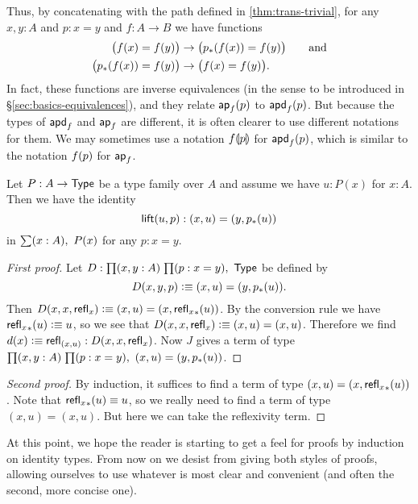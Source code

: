 Thus, by concatenating with the path defined in \autoref{thm:trans-trivial}, for any $x,y:A$ and $p:x=y$ and $f:A\to B$ we have functions
\begin{align}
  \big(f(x) = f(y)\big) &\to \big({p}_{*}\!\left({f(x)}\right) = f(y)\big)\label{eq:ap-to-apd}
  \qquad\text{and} \\
  \big({p}_{*}\!\left({f(x)}\right) = f(y)\big) &\to \big(f(x) = f(y)\big).\label{eq:apd-to-ap}
\end{align}
In fact, these functions are inverse equivalences (in the sense to be introduced in \S\ref{sec:basics-equivalences}), and they relate $\mathsf{ap}_{f} (p)$  to $\mathsf{apd}_{f} (p)$.
But because the types of $\mathsf{apd}_{f}$ and $\mathsf{ap}_{f}$ are different, it is often clearer to use different notations for them.
We may sometimes use a notation ${f}\llparenthesis{p}\rrparenthesis$ for $\mathsf{apd}_{f}(p)$, which is similar to the notation ${f}\!\left({p}\right)$ for $\mathsf{ap}_{f}$.

\begin{thm}\label{thm:path_lifting}
Let $P:A\to\mathsf{Type}$ be a type family over $A$ and assume we have $u:P(x)$ for $x:A$. Then we have the identity
\begin{equation*}
\mathsf{lift}(u,p):(x,u)=(y,{p}_{*}\!\left({u}\right))
\end{equation*}
in $\sm{x:A}P(x)$ for any $p:x=y$.
\end{thm}

\begin{proof}[First proof]
Let $D:\prd{x,y:A}{p:x=y}\type$ be defined by
\begin{equation*}
D(x,y,p)\vcentcolon\equiv (x,u)=(y,{p}_{*}\!\left({u}\right)).
\end{equation*}
Then $D(x,x,\mathsf{refl}_{x})\vcentcolon\equiv (x,u)=(x,{\mathsf{refl}_{x}}_{*}\!\left({u}\right))$. By the conversion rule we have ${\mathsf{refl}_{x}}_{*}\!\left({u}\right)\vcentcolon\equiv u$, so we see that $D(x,x,\mathsf{refl}_{x})\vcentcolon\equiv (x,u)=(x,u)$. Therefore we find $d(x)\vcentcolon\equiv\mathsf{refl}_{(x,u)}:D(x,x,\mathsf{refl}_{x})$. Now $J$ gives a term of type $\prd{x,y:A}{p:x=y}(x,u)=(y,\trans{p}{u})$.
\end{proof}
\begin{proof}[Second proof] 
  By induction, it suffices to find a term of type $(x,u)=(x,{\mathsf{refl}_{x}}_{*}\!\left({u}\right))$.
  Note that ${\mathsf{refl}_{x}}_{*}\!\left({u}\right)\equiv u$, so we really need to find a term of type $(x,u)=(x,u)$.
  But here we can take the reflexivity term.
\end{proof}

\medskip

At this point, we hope the reader is starting to get a feel for proofs by induction on identity types.
From now on we desist from giving both styles of proofs, allowing ourselves to use whatever is most clear and convenient (and often the second, more concise one).


